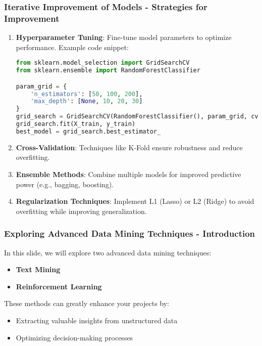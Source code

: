 \documentclass[aspectratio=169]{beamer}
\begin{document}
\begin{frame}[fragile]
  \frametitle{Iterative Improvement of Models - Strategies for Improvement}
  \begin{enumerate}
    \item \textbf{Hyperparameter Tuning}: Fine-tune model parameters to optimize performance. Example code snippet:
    \begin{lstlisting}[language=Python]
from sklearn.model_selection import GridSearchCV
from sklearn.ensemble import RandomForestClassifier

param_grid = {
    'n_estimators': [50, 100, 200],
    'max_depth': [None, 10, 20, 30]
}
grid_search = GridSearchCV(RandomForestClassifier(), param_grid, cv=5)
grid_search.fit(X_train, y_train)
best_model = grid_search.best_estimator_
    \end{lstlisting}
    
    \item \textbf{Cross-Validation}: Techniques like K-Fold ensure robustness and reduce overfitting.

    \item \textbf{Ensemble Methods}: Combine multiple models for improved predictive power (e.g., bagging, boosting).

    \item \textbf{Regularization Techniques}: Implement L1 (Lasso) or L2 (Ridge) to avoid overfitting while improving generalization.
  \end{enumerate}
\end{frame}

\begin{frame}[fragile]
    \frametitle{Exploring Advanced Data Mining Techniques - Introduction}
    In this slide, we will explore two advanced data mining techniques:
    \begin{itemize}
        \item \textbf{Text Mining}
        \item \textbf{Reinforcement Learning}
    \end{itemize}
    
    These methods can greatly enhance your projects by:
    \begin{itemize}
        \item Extracting valuable insights from unstructured data
        \item Optimizing decision-making processes
    \end{itemize}
\end{frame}
\end{document}
